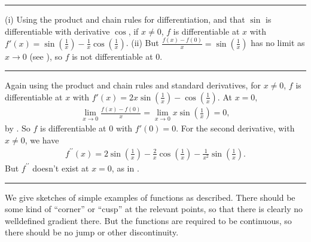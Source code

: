 \documentclass[letterpaper,10pt,english]{jupyterBook}
\begin{document}
\bigskip\hrule\bigskip


\sphinxAtStartPar
{\hyperref[\detokenize{Problems:id41}]{}}
(i) Using the product and chain rules for differentiation, and that \(\sin\) is differentiable with derivative \(\cos\),
if \(x \neq 0\), \(f\) is differentiable at \(x\) with \(f'(x) = \sin\left(\frac{1}{x}\right) - \frac{1}{x}\cos\left(\frac{1}{x}\right)\).
(ii) But
\(\frac{f(x) - f(0)}{x} = \sin\left(\frac{1}{x}\right)\) has no limit as \(x \rightarrow 0\) (see {\hyperref[\detokenize{Problems:id9}]{}}), so \(f\) is not differentiable at \(0\).


\bigskip\hrule\bigskip


\sphinxAtStartPar
{\hyperref[\detokenize{Problems:id42}]{}} Again using the product and chain rules and standard derivatives,
for \(x \neq 0\), \(f\) is differentiable at \(x\) with \(f'(x) = 2x\sin\left(\frac{1}{x}\right) - \cos\left(\frac{1}{x}\right)\). At \(x = 0,\)
\begin{equation*}
\begin{split}
\lim_{x \rightarrow 0}\frac{f(x) - f(0)}{x} = \lim_{x \rightarrow 0}x\sin\left(\frac{1}{x}\right) = 0,
\end{split}
\end{equation*}
\sphinxAtStartPar
by {\hyperref[\detokenize{Problems:id10}]{}}. So \(f\) is differentiable at \(0\) with \(f'(0) = 0\). For the second derivative, with \(x \neq 0\), we have
\begin{equation*}
\begin{split}
f^{\prime \prime}(x) = 2\sin\left(\frac{1}{x}\right) - \frac{2}{x}\cos\left(\frac{1}{x}\right) - \frac{1}{x^{2}}\sin\left(\frac{1}{x}\right).
\end{split}
\end{equation*}
\sphinxAtStartPar
But \(f^{\prime \prime}\) doesn’t exist at \(x = 0\), as in {\hyperref[\detokenize{Problems:id41}]{}}.


\bigskip\hrule\bigskip


\sphinxAtStartPar
{\hyperref[\detokenize{Problems:id43}]{}} We give sketches of simple examples of functions as described. There should be some kind of “corner” or “cusp” at the relevant points, so that there is clearly no well\sphinxhyphen{}defined gradient there. But the functions are required to be continuous, so there should be no jump or other discontinuity.
\end{document}
